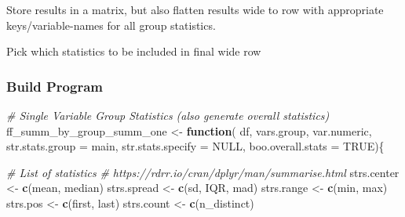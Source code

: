 \documentclass[
]{book}
\newenvironment{Shaded}{\begin{snugshade}}{\end{snugshade}}
\newcommand{\CommentTok}[1]{\textcolor[rgb]{0.56,0.35,0.01}{\textit{#1}}}
\newcommand{\ControlFlowTok}[1]{\textcolor[rgb]{0.13,0.29,0.53}{\textbf{#1}}}
\newcommand{\DataTypeTok}[1]{\textcolor[rgb]{0.13,0.29,0.53}{#1}}
\newcommand{\KeywordTok}[1]{\textcolor[rgb]{0.13,0.29,0.53}{\textbf{#1}}}
\newcommand{\NormalTok}[1]{#1}
\newcommand{\OtherTok}[1]{\textcolor[rgb]{0.56,0.35,0.01}{#1}}
\newcommand{\StringTok}[1]{\textcolor[rgb]{0.31,0.60,0.02}{#1}}
\begin{document}
Store results in a matrix, but also flatten results wide to row with appropriate keys/variable-names for all group statistics.

Pick which statistics to be included in final wide row

\hypertarget{build-program}{%
\subsubsection{Build Program}\label{build-program}}

\begin{Shaded}
\begin{Highlighting}[]
\CommentTok{\# Single Variable Group Statistics (also generate overall statistics)}
\NormalTok{ff\_summ\_by\_group\_summ\_one \textless{}{-}}\StringTok{ }\ControlFlowTok{function}\NormalTok{(}
\NormalTok{  df, vars.group, var.numeric, }\DataTypeTok{str.stats.group =} \StringTok{\textquotesingle{}main\textquotesingle{}}\NormalTok{,}
  \DataTypeTok{str.stats.specify =} \OtherTok{NULL}\NormalTok{, }\DataTypeTok{boo.overall.stats =} \OtherTok{TRUE}\NormalTok{)\{}
  
  \CommentTok{\# List of statistics}
  \CommentTok{\# https://rdrr.io/cran/dplyr/man/summarise.html}
\NormalTok{  strs.center \textless{}{-}}\StringTok{ }\KeywordTok{c}\NormalTok{(}\StringTok{\textquotesingle{}mean\textquotesingle{}}\NormalTok{, }\StringTok{\textquotesingle{}median\textquotesingle{}}\NormalTok{)}
\NormalTok{  strs.spread \textless{}{-}}\StringTok{ }\KeywordTok{c}\NormalTok{(}\StringTok{\textquotesingle{}sd\textquotesingle{}}\NormalTok{, }\StringTok{\textquotesingle{}IQR\textquotesingle{}}\NormalTok{, }\StringTok{\textquotesingle{}mad\textquotesingle{}}\NormalTok{)}
\NormalTok{  strs.range \textless{}{-}}\StringTok{ }\KeywordTok{c}\NormalTok{(}\StringTok{\textquotesingle{}min\textquotesingle{}}\NormalTok{, }\StringTok{\textquotesingle{}max\textquotesingle{}}\NormalTok{)}
\NormalTok{  strs.pos \textless{}{-}}\StringTok{ }\KeywordTok{c}\NormalTok{(}\StringTok{\textquotesingle{}first\textquotesingle{}}\NormalTok{, }\StringTok{\textquotesingle{}last\textquotesingle{}}\NormalTok{)}
\NormalTok{  strs.count \textless{}{-}}\StringTok{ }\KeywordTok{c}\NormalTok{(}\StringTok{\textquotesingle{}n\_distinct\textquotesingle{}}\NormalTok{)}
  

\end{Highlighting}
\end{Shaded}
\end{document}
